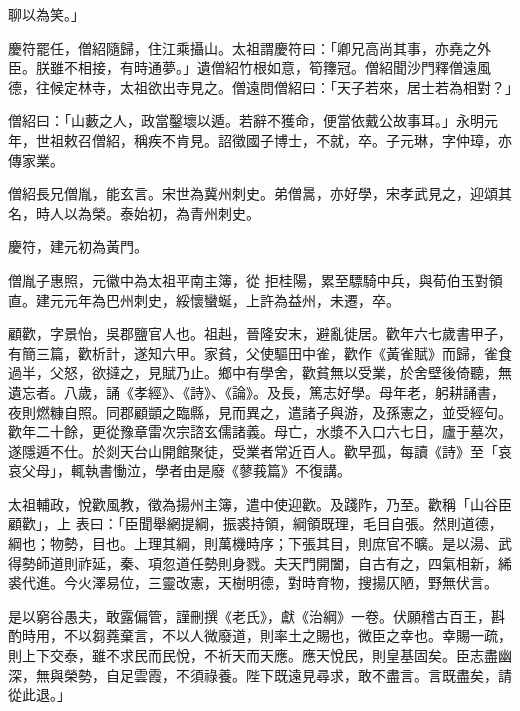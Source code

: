 \begin{pinyinscope}
 聊以為笑。」



 慶符罷任，僧紹隨歸，住江乘攝山。太祖謂慶符曰：「卿兄高尚其事，亦堯之外臣。朕雖不相接，有時通夢。」遺僧紹竹根如意，筍籜冠。僧紹聞沙門釋僧遠風德，往候定林寺，太祖欲出寺見之。僧遠問僧紹曰：「天子若來，居士若為相對？」



 僧紹曰：「山藪之人，政當鑿壞以遁。若辭不獲命，便當依戴公故事耳。」永明元年，世祖敕召僧紹，稱疾不肯見。詔徵國子博士，不就，卒。子元琳，字仲璋，亦傳家業。



 僧紹長兄僧胤，能玄言。宋世為冀州刺史。弟僧暠，亦好學，宋孝武見之，迎頌其名，時人以為榮。泰始初，為青州刺史。



 慶符，建元初為黃門。



 僧胤子惠照，元徽中為太祖平南主簿，從
 拒桂陽，累至驃騎中兵，與荀伯玉對領直。建元元年為巴州刺史，綏懷蠻蜒，上許為益州，未遷，卒。



 顧歡，字景怡，吳郡鹽官人也。祖赳，晉隆安末，避亂徙居。歡年六七歲書甲子，有簡三篇，歡析計，遂知六甲。家貧，父使驅田中雀，歡作《黃雀賦》而歸，雀食過半，父怒，欲撻之，見賦乃止。鄉中有學舍，歡貧無以受業，於舍壁後倚聽，無遺忘者。八歲，誦《孝經》、《詩》、《論》。及長，篤志好學。母年老，躬耕誦書，夜則燃糠自照。同郡顧顗之臨縣，見而異之，遣諸子與游，及孫憲之，並受經句。歡年二十餘，更從豫章雷次宗諮玄儒諸義。母亡，水漿不入口六七日，廬于墓次，遂隱遁不仕。於剡天台山開館聚徒，受業者常近百人。歡早孤，每讀《詩》至「哀哀父母」，輒執書慟泣，學者由是廢《蓼莪篇》不復講。



 太祖輔政，悅歡風教，徵為揚州主簿，遣中使迎歡。及踐阼，乃至。歡稱「山谷臣顧歡」，上
 表曰：「臣聞舉網提綱，振裘持領，綱領既理，毛目自張。然則道德，綱也；物勢，目也。上理其綱，則萬機時序；下張其目，則庶官不曠。是以湯、武得勢師道則祚延，秦、項忽道任勢則身戮。夫天門開闔，自古有之，四氣相新，絺裘代進。今火澤易位，三靈改憲，天樹明德，對時育物，搜揚仄陋，野無伏言。



 是以窮谷愚夫，敢露偏管，謹刪撰《老氏》，獻《治綱》一卷。伏願稽古百王，斟酌時用，不以芻蕘棄言，不以人微廢道，則率土之賜也，微臣之幸也。幸賜一疏，則上下交泰，雖不求民而民悅，不祈天而天應。應天悅民，則皇基固矣。臣志盡幽深，無與榮勢，自足雲霞，不須祿養。陛下既遠見尋求，敢不盡言。言既盡矣，請從此退。」




\end{pinyinscope}
